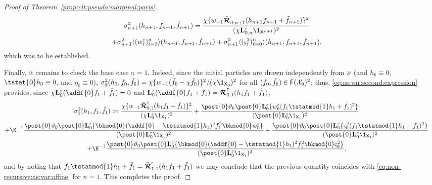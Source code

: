 \begin{proof}[Proof of Theorem~\ref{prop:clt:pseudo:marginal:paris}]
\begin{multline*}
\sigma^2_{n + 1}(h_{n + 1}, f_{n + 1}, \ftd{n + 1}) = 
\frac{\chi \{ \initwgtfunc 
\retrokmodmodnorm_{0, n + 1}( h_{n + 1} f_{n + 1} + \ftd{n + 1}) \}^2}{(\chi \ukmod{0, n} \1_{\Xset^{n + 1}})^2} \\
+ \sigma^2_{n + 1} \langle (\wgtfuncmod{\ell})_{\ell = 0}^n \rangle(h_{n + 1}, f_{n + 1}, \ftd{n + 1}) + \sigma^2_{n + 1} \langle (\ukestvar{\ell})_{\ell = 0}^n \rangle(h_{n + 1}, f_{n + 1}, \ftd{n + 1}),  
\end{multline*}
which was to be established. 

Finally, it remains to check the base case $n = 1$. Indeed, since the initial particles are drawn independently from $\nu$ (and $h_0 \equiv 0$, $\tstat{0} h_0 \equiv 0$, and $\eta_0 \equiv 0$), $\sigma^2_0(h_0, f_0, \ftd{0}) = \chi \{ \initwgtfunc (\ftd{0} - \chi \ftd{0}) \}^2 / (\chi \1_{\Xset_0})^2$ for all $(f_0, \tilde{f}_{0}) \in \mathsf{F}(\mathcal{X}_0)^2$; thus, \eqref{eq:as:var:second:expression} provides, since $\chi \ukmod{0}(\addf{0} f_1 + \bar{f}_1) = 0$ and $\ukmod{0} (\addf{0} f_1 + \bar{f}_1) = \retrokmodmodnorm_{0, 1}(h_1 f_1 + \ftd{1})$,  
\begin{multline} 
\sigma^2_1(h_1, f_1, \ftd{1}) \eqdef \frac{\chi \{  \initwgtfunc \retrokmodmodnorm_{0, 1}(h_1 f_1 + \ftd{1}) \}^2}{(\chi \ukmod{0} \1_{\Xset_1})^2} + 
\frac{\post{0} \adjfuncforward{0} \post{0} \ukmod{0} \{\wgtfuncmod{0}(f_1 \tstatmod{1} h_1 + \bar{f}_1)^2 \}}{(\post{0} \ukmod{0} \1_{\Xset_1})^2} \\
+ \K^{-1} \frac{\post{0} \adjfuncforward{0} \post{0} \ukmod{0} \{\bkmod{0}(\addf{0} - \tstatmod{1} h_1)^2 f_1^2 \bkmod{0} \wgtfuncmod{0} \}}{(\post{0} \ukmod{0} \1_{\Xset_1})^2} 
+ \frac{\post{0} \adjfuncforward{0} \post{0} \ukmod{0} \{ \ukestvar{0} (f_1 \tstatmod{1} h_1 + \bar{f}_1)^2 \}}{(\post{0} \ukmod{0} \1_{\Xset_1})^2} \\
+ \K^{-1} \frac{\post{0} \adjfuncforward{0} \post{0} \ukmod{0} \{\bkmod{0}(\addf{0} - \tstatmod{1} h_1)^2 f_1^2 \bkmod{0} \ukestvar{0} \}}{(\post{0} \ukmod{0} \1_{\Xset_1})^2},  
\end{multline}
and by noting that $f_1 \tstatmod{1} h_1 + \bar{f}_1 = \retrokmodmodnorm_{1, 1} (h_1 f_1 + \ftd{1})$ we may conclude that the previous quantity coincides with \eqref{eq:non-recursive:as:var:affine} for $n = 1$. This completes the proof. 
\end{proof}

